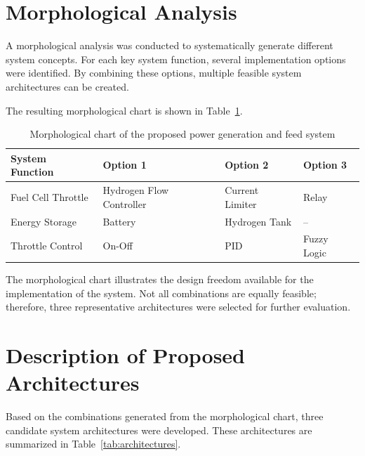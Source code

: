 \section{Morphological Analysis}

A morphological analysis was conducted to systematically generate different system concepts. For each key system function, several implementation options were identified. By combining these options, multiple feasible system architectures can be created.

The resulting morphological chart is shown in Table~\ref{tab:morphological chart}.

\begin{table}[htp]
    \begin{tabularx}{\textwidth}{|l|>{\centering\arraybackslash}X|>{\centering\arraybackslash}X|>{\centering\arraybackslash}X|}
        \hline
        \textbf{System Function} & \textbf{Option 1}        & \textbf{Option 2} & \textbf{Option 3} \\
        \hline
        Fuel Cell Throttle       & Hydrogen Flow Controller & Current Limiter   & Relay             \\
        \hline
        Energy Storage           & Battery                  & Hydrogen Tank     & --                \\
        \hline
        Throttle Control         & On-Off                   & PID               & Fuzzy Logic       \\
        \hline
    \end{tabularx}
    \caption{Morphological chart of the proposed power generation and feed system}
    \label{tab:morphological chart}
\end{table}

The morphological chart illustrates the design freedom available for the implementation of the system. Not all combinations are equally feasible; therefore, three representative architectures were selected for further evaluation.

\section{Description of Proposed Architectures}

Based on the combinations generated from the morphological chart, three candidate system architectures were developed. These architectures are summarized in Table~\ref{tab:architectures}.


